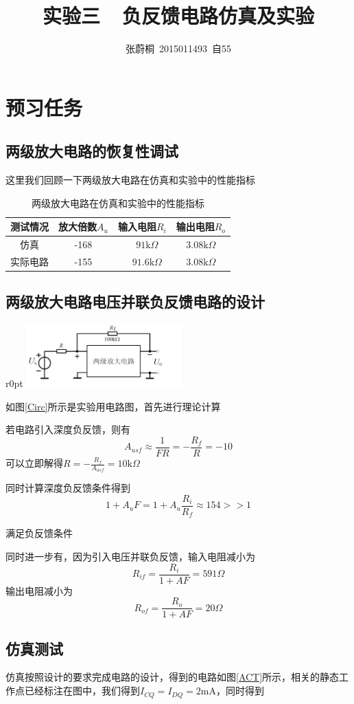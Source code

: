 \documentclass[UTF8,a4paper]{article}
\title{实验三\ \ 负反馈电路仿真及实验}
\author{张蔚桐\ 2015011493\ 自55}
\begin{document}
\maketitle
\section{预习任务}
\subsection{两级放大电路的恢复性调试}
这里我们回顾一下两级放大电路在仿真和实验中的性能指标

\begin{table}
\centering
\caption{两级放大电路在仿真和实验中的性能指标}
\begin{tabular}{|c|c|c|c|}
\hline 
测试情况 & 放大倍数$A_u$ & 输入电阻$R_i$ & 输出电阻$R_o$\\
\hline 
仿真 & -168 &　$91\mathrm{k}\Omega$ & $3.08\mathrm{k}\Omega$ \\
\hline 
实际电路 & -155 &　$91.6\mathrm{k}\Omega$ & $3.08\mathrm{k}\Omega$ \\
\hline 
\end{tabular}
\end{table}
\subsection{两级放大电路电压并联负反馈电路的设计}
\begin {wrapfigure}{r}{0pt}
\includegraphics [width=60mm]{circuit.png}
\caption{实验用电路图}
\label{Circ}
\end {wrapfigure}
如图\ref{Circ}所示是实验用电路图，首先进行理论计算

若电路引入深度负反馈，则有
$$ A_{usf}\approx \frac{1}{FR}=-\frac{R_f}{R}=-10$$
可以立即解得$R=-\frac{R_f}{A_{usf}}=10\mathrm{k}\Omega$

同时计算深度负反馈条件得到
$$1+A_uF=1+A_u\frac{R_i}{R_f}\approx154 >>1$$

满足负反馈条件

同时进一步有，因为引入电压并联负反馈，输入电阻减小为
$$R_{if}=\frac{R_i}{1+AF}=591\Omega$$
输出电阻减小为
$$R_{of}=\frac{R_o}{1+AF}=20\Omega$$
\subsection{仿真测试}
仿真按照设计的要求完成电路的设计，得到的电路如图\ref{ACT}所示，相关的静态工作点已经标注在图中，我们得到$I_{CQ}=I_{DQ}=2\mathrm{mA}$，同时得到
\end{document}
